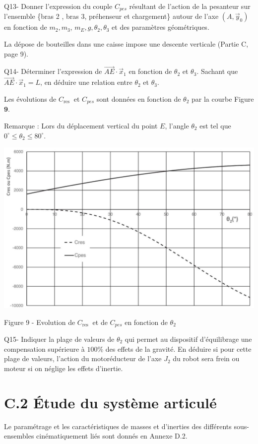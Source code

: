 \documentclass[10pt]{article}
\begin{document}
Q13- Donner l'expression du couple $C_{p e s}$ résultant de l'action de la pesanteur sur l'ensemble \{bras 2 , bras 3, préhenseur et chargement\} autour de l'axe $\left(A, \vec{y}_{0}\right)$ en fonction de $m_{2}, m_{3}$, $m_{E}, g, \theta_{2}, \theta_{3}$ et des paramètres géométriques.

La dépose de bouteilles dans une caisse impose une descente verticale (Partie C, page 9).

Q14- Déterminer l'expression de $\overrightarrow{A E} \cdot \vec{x}_{1}$ en fonction de $\theta_{2}$ et $\theta_{3}$. Sachant que $\overrightarrow{A E} \cdot \vec{x}_{1}=L$, en déduire une relation entre $\theta_{2}$ et $\theta_{3}$.

Les évolutions de $C_{\text {res }}$ et $C_{p e s}$ sont données en fonction de $\theta_{2}$ par la courbe Figure $\mathbf{9}$.

Remarque : Lors du déplacement vertical du point $E$, l'angle $\theta_{2}$ est tel que $0^{\circ} \leq \theta_{2} \leq 80^{\circ}$.

\begin{center}
\includegraphics[max width=\textwidth]{2023_11_27_dfbf12e0af72c49ac6a4g-10}
\end{center}

Figure 9 - Evolution de $C_{\text {res }}$ et de $C_{p e s}$ en fonction de $\theta_{2}$

Q15- Indiquer la plage de valeurs de $\theta_{2}$ qui permet au dispositif d'équilibrage une compensation supérieure à $100 \%$ des effets de la gravité. En déduire si pour cette plage de valeurs, l'action du motoréducteur de l'axe $J_{2}$ du robot sera frein ou moteur si on néglige les effets d'inertie.

\section*{C.2 Étude du système articulé}
Le paramétrage et les caractéristiques de masses et d'inerties des différents sous-ensembles cinématiquement liés sont donnés en Annexe D.2.
\end{document}
